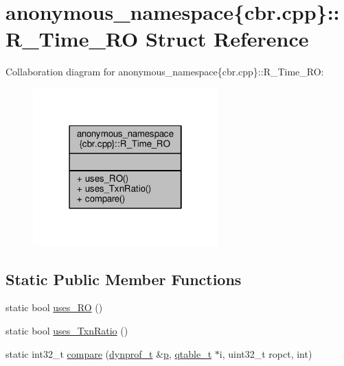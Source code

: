 \hypertarget{structanonymous__namespace_02cbr_8cpp_03_1_1R__Time__RO}{\section{anonymous\-\_\-namespace\{cbr.\-cpp\}\-:\-:R\-\_\-\-Time\-\_\-\-R\-O Struct Reference}
\label{structanonymous__namespace_02cbr_8cpp_03_1_1R__Time__RO}
}


Collaboration diagram for anonymous\-\_\-namespace\{cbr.\-cpp\}\-:\-:R\-\_\-\-Time\-\_\-\-R\-O\-:
\nopagebreak
\begin{figure}[H]
\begin{center}
\leavevmode
\includegraphics[width=202pt]{structanonymous__namespace_02cbr_8cpp_03_1_1R__Time__RO__coll__graph}
\end{center}
\end{figure}
\subsection*{Static Public Member Functions}
\begin{DoxyCompactItemize}
\item 
static bool \hyperlink{structanonymous__namespace_02cbr_8cpp_03_1_1R__Time__RO_a8828115d64ad20f5a5173821aa7e6aeb}{uses\-\_\-\-R\-O} ()
\item 
static bool \hyperlink{structanonymous__namespace_02cbr_8cpp_03_1_1R__Time__RO_ad26e40ced6345e2c6141f09fe4399cb3}{uses\-\_\-\-Txn\-Ratio} ()
\item 
static int32\-\_\-t \hyperlink{structanonymous__namespace_02cbr_8cpp_03_1_1R__Time__RO_ae0f8821a0d5bbfbe24354a8bce114627}{compare} (\hyperlink{structstm_1_1dynprof__t}{dynprof\-\_\-t} \&\hyperlink{counted__ptr_8hpp_a5c9f59d7c24e3fd6ceae319a968fc3e0}{p}, \hyperlink{structstm_1_1qtable__t}{qtable\-\_\-t} $\ast$i, uint32\-\_\-t ropct, int)
\end{DoxyCompactItemize}


